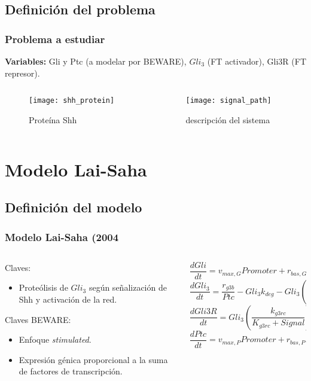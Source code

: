 \documentclass{beamer}
\begin{document}
\subsection{Definición del problema}

\begin{frame}
\frametitle{Problema a estudiar}
\textbf{Variables:} Gli y Ptc (a modelar por BEWARE), $Gli_3$ (FT activador), Gli3R (FT represor).
\begin{columns}
	\begin{column}{0.5\textwidth}
\begin{figure}
\texttt{[image: shh\_protein]}\caption{Proteína Shh}
\end{figure}
\end{column}
\begin{column}{0.5\textwidth}
\begin{figure}
	\texttt{[image: signal\_path]}\caption{descripción del sistema}
\end{figure}
\end{column}
\end{columns}
\end{frame}

\section{Modelo Lai-Saha}
\subsection{Definición del modelo}
\begin{frame}
  \frametitle{Modelo Lai-Saha (2004}
\begin{columns}
	\begin{column}{0.5\textwidth}
		Claves:
		\begin{itemize}
			\item Proteólisis de $Gli_3$ según señalización de Shh y activación de la red. 
		\end{itemize}
			Claves BEWARE:
	\begin{itemize}
		\item Enfoque \textit{stimulated}.
		\item Expresión génica proporcional a la suma de factores de transcripción.
	\end{itemize}
	\end{column}
	\begin{column}{0.5\textwidth}
		{\tiny\[ \frac{dGli}{dt} = v_{max,G}Promoter+r_{bas,G}Basal-k_{deg}Gli \]}
		{\tiny\[ \frac{dGli_3}{dt} = \frac{r_{g3b}}{Ptc}-Gli_3k_{deg}-Gli_3\left(\frac{k_{g3rc}}{K_{g3rc}+Signal}\right), \]}
		{\tiny\[ \frac{dGli3R}{dt}= Gli_3\left(\frac{k_{g3rc}}{K_{g3rc}+Signal}\right)-k_{deg}Gli3R, \]}
		{\tiny\[ \frac{dPtc}{dt} = v_{max,P}Promoter+r_{bas,P}Basal-k_{degp}Ptc.\]}

	\end{column}
\end{columns}
\end{frame}
\end{document}
